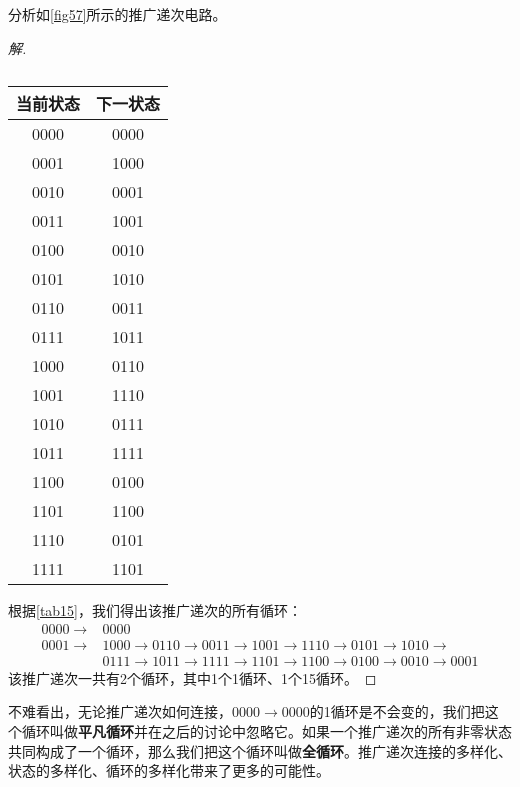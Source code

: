 \begin{example}{}{}
分析如\autoref{fig57}所示的推广递次电路。
\begin{figure}[H]
\centering
{}
\caption{}\label{fig57}
\end{figure}
\begin{proof}[解]
\begin{table}[H]
\centering
\begin{tabular}{|c|c|}
\hline
当前状态&下一状态\\\hline
0000&0000\\\hline
0001&1000\\\hline
0010&0001\\\hline
0011&1001\\\hline
0100&0010\\\hline
0101&1010\\\hline
0110&0011\\\hline
0111&1011\\\hline
1000&0110\\\hline
1001&1110\\\hline
1010&0111\\\hline
1011&1111\\\hline
1100&0100\\\hline
1101&1100\\\hline
1110&0101\\\hline
1111&1101\\\hline
\end{tabular}
\caption{}\label{tab15}
\end{table}
根据\autoref{tab15}，我们得出该推广递次的所有循环：
\begin{align*}
0000\to &0000\\
0001\to &1000\to 0110\to 0011\to 1001\to 1110\to 0101\to 1010\to \\
        &0111\to 1011\to 1111\to 1101\to 1100\to 0100\to 0010\to 0001
\end{align*}
该推广递次一共有2个循环，其中1个1循环、1个15循环。
\end{proof}
\end{example}


不难看出，无论推广递次如何连接，$0000\to 0000$的1循环是不会变的，我们把这个循环叫做\textbf{平凡循环}并在之后的讨论中忽略它。如果一个推广递次的所有非零状态共同构成了一个循环，那么我们把这个循环叫做\textbf{全循环}。推广递次连接的多样化、状态的多样化、循环的多样化带来了更多的可能性。

